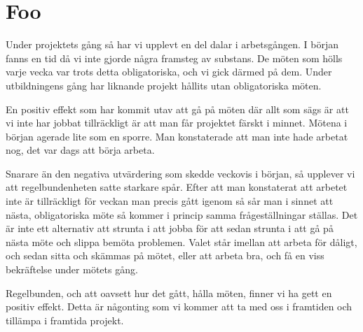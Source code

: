 \section{Foo}
Under projektets gång så har vi upplevt en del dalar i arbetsgången. I början fanns en tid då vi inte gjorde några framsteg av substans. De möten som hölls varje vecka var trots detta obligatoriska, och vi gick därmed på dem. Under utbildningens gång har liknande projekt hållits utan obligatoriska möten. 

En positiv effekt som har kommit utav att gå på möten där allt som sägs är att vi inte har jobbat tillräckligt är att man får projektet färskt i minnet. Mötena i början agerade lite som en sporre. Man konstaterade att man inte hade arbetat nog, det var dags att börja arbeta. 

Snarare än den negativa utvärdering som skedde veckovis i början, så upplever vi att regelbundenheten satte starkare spår. Efter att man konstaterat att arbetet inte är tillräckligt för veckan man precis gått igenom så sår man i sinnet att nästa, obligatoriska möte så kommer i princip samma frågeställningar ställas. Det är inte ett alternativ att strunta i att jobba för att sedan strunta i att gå på nästa möte och slippa bemöta problemen. Valet står imellan att arbeta för dåligt, och sedan sitta och skämmas på mötet, eller att arbeta bra, och få en viss bekräftelse under mötets gång. 

Regelbunden, och att oavsett hur det gått, hålla möten, finner vi ha gett en positiv effekt. Detta är någonting som vi kommer att ta med oss i framtiden och tillämpa i framtida projekt. 
